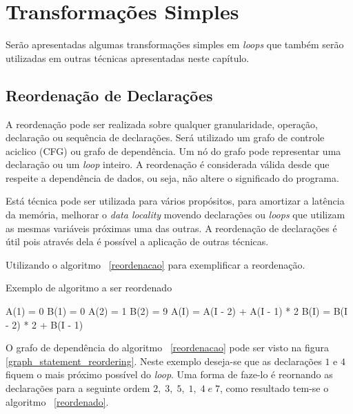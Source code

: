 
\section{Transformações Simples}

Serão apresentadas algumas transformações simples em \textit{loops} que também
serão utilizadas em outras técnicas apresentadas neste capítulo.

\subsection{Reordenação de Declarações}

A reordenação pode ser realizada sobre qualquer granularidade, operação,
declaração ou sequência de declarações. 
Será utilizado um grafo de controle aciclico (CFG) ou grafo de dependência.
Um nó do grafo pode representar uma declaração ou um \textit{loop} inteiro.
A reordenação é considerada válida desde que respeite a dependência de dados, 
ou seja, não altere o significado do programa.

Está técnica pode ser utilizada para vários propósitos, para 
amortizar a latência da memória, melhorar o \textit{data locality} movendo 
declarações ou \textit{loops} que utilizam as mesmas variáveis próximas uma das 
outras. 
A reordenação de declarações é útil pois através dela é possível 
a aplicação de outras técnicas. 

Utilizando o algoritmo ~\ref{reordenacao} para exemplificar a reordenação. 

\begin{algorithm}
\caption{Exemplo de algoritmo a ser reordenado}
\label{reordenacao}
\begin{algorithmic}[1]

\STATE A(1) = 0
\STATE B(1) = 0
\STATE A(2) = 1
\STATE B(2) = 9
\ENDIF
{}
\STATE A(I) = A(I - 2) + A(I - 1) * 2
\STATE B(I) = B(I - 2) * 2 + B(I - 1) 
\ENDFOR

\end{algorithmic}
\end{algorithm}

O grafo de dependência do algoritmo ~\ref{reordenacao} pode ser visto na figura 
\ref{graph_statement_reordering}. 
Neste exemplo deseja-se que as declarações $1$ e $4$ fiquem o mais próximo 
possível do \textit{loop}. 
Uma forma de faze-lo é reornando as declarações para a seguinte ordem $2,\; 3,\; 5,
\;1,\; 4\; e\; 7$, como resultado tem-se o algoritmo ~\ref{reordenado}.




